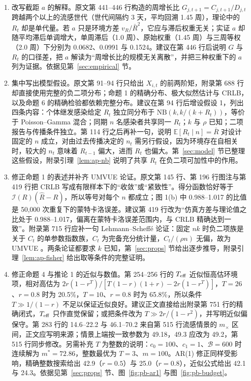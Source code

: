 \begin{enumerate}
\item 改写截距 $a$ 的解释。原文第 441--446 行构造的周增长比 $G_{j,t+1}=C_{j,t+1}/D_{j,t}$ 跨越两个以上的流感世代（世代间隔约 3 天，平均回溯 1.45 周），理论中的 $R_t$ 却是单代量。若 $a$ 只是环境方差 $v_R/\bar R^2$，它应与滞后权重无关；实证 $a$ 却随平均滞后单调增大，单周滞后（1.0 周）、原始权重（1.45 周）与三周等权（2.0 周）下分别为 0.0682、0.0991 与 0.1524。建议在第 446 行后说明 $G$ 与 $R_t$ 的口径差，把 $a$ 解读为“周增长比的规模无关离散”，并把三种权重下的 $a$ 列为证据。依据见第~\ref{sec:empirical} 节。

\item 集中写出模型假设。原文第 91--94 行只给出 $X_{i,t}$ 的前两阶矩，附录第 688 行却直接使用完整的负二项分布；命题 1 的精确分布、极大似然估计与 CRLB，以及命题 6 的精确检验都依赖完整分布。建议在第 94 行后增设假设 1，列出四条内容：个体继发感染给定 $R_t$ 独立同分布于 $\mathrm{NB}(k,k/(k+R_t))$，等价于 Poisson--Gamma 混合；同期 $n$ 名感染者共享同一 $R_t$；$k$ 与 $\rho$ 已知；二项报告与传播条件独立。第 114 行之后再补一句，说明 $\mathbb{E}[R_t\mid n]=\bar R$ 对设计固定的 $n$ 成立，对由过去传播决定的 $n_t$ 需另行假设，因为环境存在自相关时，较大的 $n_t$ 意味着 $R_{t-1}$ 偏大，进而 $R_t$ 也偏大。第~\ref{sec:model} 节已整理这些假设，附录引理~\ref{lem:ap-nb} 说明了共享 $R_t$ 在负二项可加性中的作用。

\item 修正命题 1 的表述并补齐 UMVUE 论证。原文第 145 行、第 196 行图注与第 419 行把 CRLB 写成有限样本下的“收敛”或“紧致性”。得分函数恰好等于 $\mathcal I(R)(\widehat R-R)$，所以等号对每个 $n$ 都成立；图 1(b) 中 0.988--1.017 的比值是 50,000 次重复下的蒙特卡洛误差。建议第 419 行改为“仿真方差与理论值之比处于 0.988--1.017，偏离在蒙特卡洛误差范围内，与 CRLB 精确达到一致”。附录第 715 行应补一句 Lehmann--Scheffé 论证：固定 $nk$ 时负二项族是关于 $C_t$ 的单参数指数族，$C_t$ 为完备充分统计量，$C_t/(\rho n)$ 无偏，故为 UMVUE \citep{lehmann1998point}。两条论证都要求 $k$ 已知，第~\ref{sec:props} 节给出逐步推导，附录引理~\ref{lem:ap-fisher} 给出取等条件的完整证明。

\item 修正命题 4 与推论 1 的近似与数值。第 254--256 行的 $T_{\rm eff}$ 近似恒高估环境项，相对高估为 $2r(1-r^T)/[T(1-r)(1+r)-2r(1-r^T)]$，$T=26$、$r=0.8$ 时为 20.5\%，$T=10$、$r=0.8$ 时为 65.8\%，所以条件 $T\gg1/(1-r)$ 不足以保证近似良好。建议正文直接给出附录第 751 行的精确闭式，$T_{\rm eff}$ 只作直觉保留；或把条件改为 $T\gg2r/(1-r^2)$，并写明近似偏保守。第 283 行的 14.6--22.2 与 46.1--70.2 来自第 515 行流感情景的 $m_\times$ 区间，正文应写明来源；情景上端按一致参数为 49.18，49.3 应改为 49.2，第 515 行同步修改。另需补充 $T$ 为整数的说明：$c_0=100$、$c_1=1$、$\mathcal B=600$ 时连续解为 $m^*=72.86$，整数最优为 $T=3$、$m=100$。AR(1) 修正同样受影响，精确整数搜索给出 42.9（$r=0.5$）与 25.0（$r=0.8$），近似公式给出 42.1 与 24.3。依据见第~\ref{sec:props} 节、图~\ref{fig:pb-ar1} 与图~\ref{fig:pb-budget}。


\end{enumerate}
